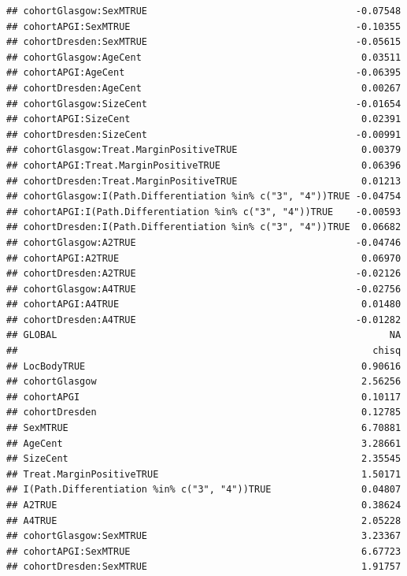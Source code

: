 \documentclass{article}\usepackage[]{graphicx}\usepackage[]{color}
\makeatletter
\newenvironment{kframe}{%
 \def\at@end@of@kframe{}%
 \ifinner\ifhmode%
  \def\at@end@of@kframe{\end{minipage}}%
  \begin{minipage}{\columnwidth}%
 \fi\fi%
 \def\FrameCommand##1{\hskip\@totalleftmargin \hskip-\fboxsep
 \colorbox{shadecolor}{##1}\hskip-\fboxsep
     \hskip-\linewidth \hskip-\@totalleftmargin \hskip\columnwidth}%
 \MakeFramed {\advance\hsize-\width
   \@totalleftmargin\z@ \linewidth\hsize
   \@setminipage}}%
 {\par\unskip\endMakeFramed%
 \at@end@of@kframe}
\newenvironment{knitrout}{}{} %
\makeatother
\begin{document}
\begin{knitrout}
\begin{kframe}
\begin{verbatim}
## cohortGlasgow:SexMTRUE                                     -0.07548
## cohortAPGI:SexMTRUE                                        -0.10355
## cohortDresden:SexMTRUE                                     -0.05615
## cohortGlasgow:AgeCent                                       0.03511
## cohortAPGI:AgeCent                                         -0.06395
## cohortDresden:AgeCent                                       0.00267
## cohortGlasgow:SizeCent                                     -0.01654
## cohortAPGI:SizeCent                                         0.02391
## cohortDresden:SizeCent                                     -0.00991
## cohortGlasgow:Treat.MarginPositiveTRUE                      0.00379
## cohortAPGI:Treat.MarginPositiveTRUE                         0.06396
## cohortDresden:Treat.MarginPositiveTRUE                      0.01213
## cohortGlasgow:I(Path.Differentiation %in% c("3", "4"))TRUE -0.04754
## cohortAPGI:I(Path.Differentiation %in% c("3", "4"))TRUE    -0.00593
## cohortDresden:I(Path.Differentiation %in% c("3", "4"))TRUE  0.06682
## cohortGlasgow:A2TRUE                                       -0.04746
## cohortAPGI:A2TRUE                                           0.06970
## cohortDresden:A2TRUE                                       -0.02126
## cohortGlasgow:A4TRUE                                       -0.02756
## cohortAPGI:A4TRUE                                           0.01480
## cohortDresden:A4TRUE                                       -0.01282
## GLOBAL                                                           NA
##                                                               chisq
## LocBodyTRUE                                                 0.90616
## cohortGlasgow                                               2.56256
## cohortAPGI                                                  0.10117
## cohortDresden                                               0.12785
## SexMTRUE                                                    6.70881
## AgeCent                                                     3.28661
## SizeCent                                                    2.35545
## Treat.MarginPositiveTRUE                                    1.50171
## I(Path.Differentiation %in% c("3", "4"))TRUE                0.04807
## A2TRUE                                                      0.38624
## A4TRUE                                                      2.05228
## cohortGlasgow:SexMTRUE                                      3.23367
## cohortAPGI:SexMTRUE                                         6.67723
## cohortDresden:SexMTRUE                                      1.91757

\end{verbatim}
\end{kframe}
\end{knitrout}
\end{document}
